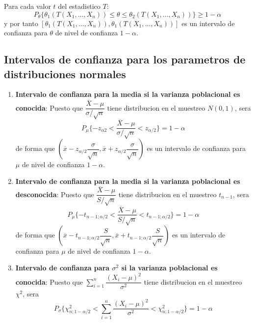 \documentclass[10pt]{extarticle}
\newcommand{\<}{\langle}
\renewcommand{\>}{\rangle}
\theoremstyle{definition}
\begin{document}
Para cada valor $t$ del estadistico $T$:
\begin{equation*}
  P_\theta \{ \theta_1(T(X_1, ..., X_n)) \leq \theta \leq \theta_2(T(X_1, ..., X_n)) \} \geq 1 - \alpha
\end{equation*}
y por tanto $[\theta_1(T(X_1, ..., X_n)), \theta_1(T(X_1, ..., X_n))]$ es un intervalo de confianza para $\theta$ de nivel de confianza $1-\alpha$.

\subsection*{Intervalos de confianza para los parametros de distribuciones normales}

\begin{enumerate}
  \item \textbf{Intervalo de confianza para la media si la varianza poblacional es conocida}: Puesto que $\dfrac{\overline{X} - \mu}{\sigma / \sqrt{n}}$ tiene distribucion en el muestreo $N(0,1)$, sera
        \begin{equation*}
          P_\mu \{ -z_{\alpha  2} < \dfrac{\overline{X} - \mu}{\sigma / \sqrt{n}} < z_{\alpha / 2}\} = 1 - \alpha
        \end{equation*}
        de forma que $(\overline{x} - z_{\alpha/2} \dfrac{\sigma}{\sqrt{n}}, \overline{x} + z_{\alpha / 2} \dfrac{\sigma}{\sqrt{n}})$ es un intervalo de confianza para $\mu$ de nivel de confianza $1-\alpha$.
  \item \textbf{Intervalo de confianza para la media si la varianza poblacional es desconocida}: Puesto que $\dfrac{\overline{X} - \mu}{S / \sqrt{n}}$ tiene distribucion en el muestreo $t_{n-1}$, sera
        \begin{equation*}
          P_\mu \{ -t_{n-1;\alpha/2} < \dfrac{\overline{X} - \mu}{S / \sqrt{n}} < t_{n-1;\alpha / 2}\} = 1 - \alpha
        \end{equation*}
        de forma que $(\overline{x} - t_{n-1;\alpha/2} \dfrac{S}{\sqrt{n}}, \overline{x} + t_{n-1;\alpha/2} \dfrac{S}{\sqrt{n}})$ es un intervalo de confianza para $\mu$ de nivel de confianza $1-\alpha$.
  \item \textbf{Intervalo de confianza para $\sigma^2$ si la varianza poblacional es conocida}: Puesto que $\sum_{i=1}^n\dfrac{(X_i - \mu)^2}{\sigma^2}$ tiene distribucion en el muestreo $\chi^2$, sera
        \begin{equation*}
          P_\sigma \{ \chi^2_{n;1-\alpha/2} < \sum_{i=1}^n\dfrac{(X_i - \mu)^2}{\sigma^2} < \chi^2_{n;1-\alpha/2} \} = 1 - \alpha

\end{equation*}
\end{enumerate}
\end{document}
